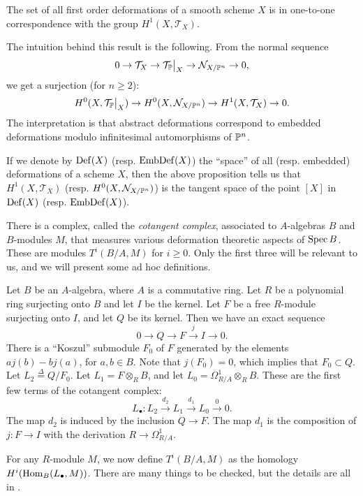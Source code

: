 \begin{proposition}
The set of all first order deformations of a smooth scheme $X$ is in one-to-one correspondence with the group $H^1(X,\mathcal T_X)$.
\end{proposition}

\begin{remark}
The intuition behind this result is the following. From the normal sequence
\[
0 \to \mathcal T_X \to \restr{\mathcal T_\P}{X} \to \mathcal N_{X/\P^n} \to 0,
\]
we get a surjection (for $n \geq 2$):
\[
H^0(X, \restr{\mathcal T_\P}{X}) \to H^0(X,\mathcal N_{X/\P^n}) \to H^1(X,\mathcal T_X) \to 0.
\]
The interpretation is that abstract deformations correspond to embedded deformations modulo infinitesimal automorphisms of $\P^n$.
\end{remark}

If we denote by $\Def(X)$  (resp. $\EmbDef(X)$) the ``space'' of all (resp. embedded) deformations of a scheme $X$, then the above proposition tells us that $H^1(X,\mathcal T_X)$ (resp. $H^0(X,\mathcal N_{X/\P^n})$) is the tangent space of the point $[X]$ in $\Def(X)$ (resp. $\EmbDef(X)$).

There is a complex, called the \emph{cotangent complex}, associated to $A$-algebras $B$ and $B$-modules $M$, that measures various deformation theoretic aspects of $\Spec B$. These are modules $T^i(B/A,M)$ for $i \geq 0$. Only the first three will be relevant to us, and we will present some ad hoc definitions.

Let $B$ be an $A$-algebra, where $A$ is a commutative ring. Let $R$ be a polynomial ring surjecting onto $B$ and let $I$ be the kernel. Let $F$ be a free $R$-module surjecting onto $I$, and let $Q$ be its kernel. Then we have an exact sequence
\[
0 \to Q \to F \xrightarrow{j} I \to 0.
\]
There is a ``Koszul'' submodule $F_0$ of $F$ generated by the elements $aj(b)-bj(a)$, for $a,b \in B$. Note that $j(F_0)=0$, which implies that $F_0 \subset Q$. Let $L_2 \stackrel \Delta = Q/F_0$. Let $L_1 = F \otimes_R B$, and let $L_0 = \Omega_{R/A}^1 \otimes_R B$. These are the first few terms of the cotangent complex:
\[
L_\bullet: L_2 \xrightarrow{d_2} L_1 \xrightarrow{d_1}  L_0 \xrightarrow{0} 0.
\]
The map $d_2$ is induced by the inclusion $Q \to F$. The map $d_1$ is the composition of $j:F \to I$ with the derivation $R \to \Omega^1_{R/A}$.

For any $R$-module $M$, we now define $T^i(B/A,M)$ as the homology $H^i(\Hom_B(L_\bullet,M))$. There are many things to be checked, but the details are all in \cite{hartshorne_deformations}.

